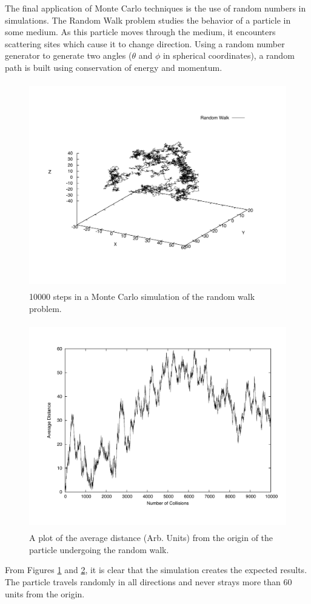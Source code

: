 \documentclass[12pt]{article}
\begin{document}
The final application of Monte Carlo techniques is the use of random numbers in simulations.  The Random Walk problem studies the behavior of a particle in some medium.  As this particle moves through the medium, it encounters scattering sites which cause it to change direction.  Using a random number generator to generate two angles ($\theta$ and $\phi$ in spherical coordinates), a random path is built using conservation of energy and momentum.  
\begin{figure}[!h]
\centering
\includegraphics[width =120 mm, height = 90mm]{Ex_4_30.pdf}
\caption{10000 steps in a Monte Carlo simulation of the random walk problem.}
\label{fig:RandomWalk}
\end{figure}
\begin{figure}[!h]
\centering
\includegraphics[width =120 mm, height = 90mm]{Ex_4_30_dist.pdf}
\caption{A plot of the average distance (Arb. Units) from the origin of the particle undergoing the random walk.}
\label{fig:RandomWalkDist}
\end{figure}
From Figures \ref{fig:RandomWalk} and \ref{fig:RandomWalkDist}, it is clear that the simulation creates the expected results.  The particle travels randomly in all directions and never strays more than 60 units from the origin.
\end{document}
